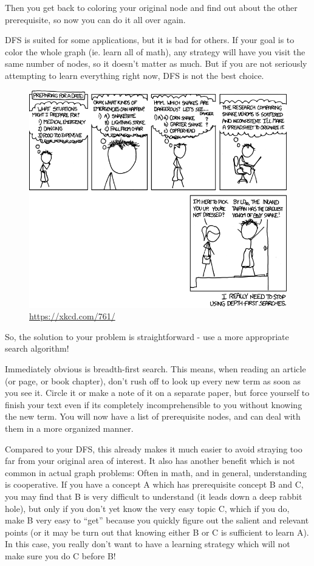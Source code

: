Then you get back to coloring your original node and find out about the other
prerequisite, so now you can do it all over again.

DFS is suited for some applications, but it is bad for others. If your goal is to color
the whole graph (ie. learn all of math), any strategy will have you visit the same number
of nodes, so it doesn't matter as much. But if you are not seriously attempting to learn
everything right now, DFS is not the best choice.

\begin{figure}[H] \centering \includegraphics[width=.8\textwidth]{Pics/dfs.png}
\captionsetup{labelformat=empty} \caption{\url{https://xkcd.com/761/}} \end{figure}

So, the solution to your problem is straightforward - use a more appropriate search
algorithm!

Immediately obvious is breadth-first search. This means, when reading an article (or page,
or book chapter), don't rush off to look up every new term as soon as you see it. Circle
it or make a note of it on a separate paper, but force yourself to finish your text even
if its completely incomprehensible to you without knowing the new term. You will now have
a list of prerequisite nodes, and can deal with them in a more organized manner.

\thispagestyle{empty}

Compared to your DFS, this already makes it much easier to avoid straying too far from
your original area of interest. It also has another benefit which is not common in actual
graph problems: Often in math, and in general, understanding is cooperative. If you have a
concept A which has prerequisite concept B and C, you may find that B is very difficult to
understand (it leads down a deep rabbit hole), but only if you don't yet know the very
easy topic C, which if you do, make B very easy to ``get'' because you quickly figure out
the salient and relevant points (or it may be turn out that knowing either B or C is
sufficient to learn A). In this case, you really don't want to have a learning strategy
which will not make sure you do C before B!

